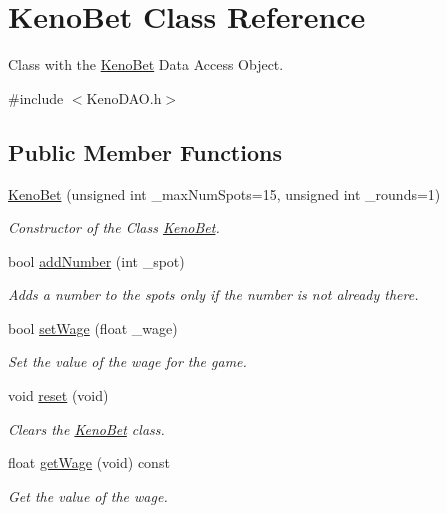 \hypertarget{class_keno_bet}{}\section{Keno\+Bet Class Reference}
\label{class_keno_bet}


Class with the \hyperlink{class_keno_bet}{Keno\+Bet} Data Access Object.  




{\ttfamily \#include $<$Keno\+D\+A\+O.\+h$>$}

\subsection*{Public Member Functions}
\begin{DoxyCompactItemize}
\item 
\hyperlink{class_keno_bet_a133a3f4f896c51fca13521d6d97f9ad0}{Keno\+Bet} (unsigned int \+\_\+max\+Num\+Spots=15, unsigned int \+\_\+rounds=1)
\begin{DoxyCompactList}\small\item\em Constructor of the Class \hyperlink{class_keno_bet}{Keno\+Bet}. \end{DoxyCompactList}\item 
bool \hyperlink{class_keno_bet_a4302a2ea194138338de0420463188ede}{add\+Number} (int \+\_\+spot)
\begin{DoxyCompactList}\small\item\em Adds a number to the spots only if the number is not already there. \end{DoxyCompactList}\item 
bool \hyperlink{class_keno_bet_a496aac2de78b82948d83e9c75f464196}{set\+Wage} (float \+\_\+wage)
\begin{DoxyCompactList}\small\item\em Set the value of the wage for the game. \end{DoxyCompactList}\item 
void \hyperlink{class_keno_bet_acc2afd4d502e44fdfbb122f3389bc633}{reset} (void)
\begin{DoxyCompactList}\small\item\em Clears the \hyperlink{class_keno_bet}{Keno\+Bet} class. \end{DoxyCompactList}\item 
float \hyperlink{class_keno_bet_a004aae494dff90ba8b97e0d2f422de60}{get\+Wage} (void) const 
\begin{DoxyCompactList}\small\item\em Get the value of the wage. \end{DoxyCompactList}\item 

\end{DoxyCompactItemize}
